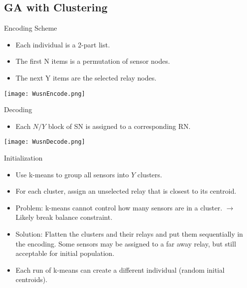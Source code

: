 \documentclass[main.tex]{subfiles}
\begin{document}
\subsection{GA with Clustering}
\begin{frame}{Encoding Scheme}
	\begin{itemize}
		\item Each individual is a 2-part list.
		\item The first N items is a permutation of sensor nodes.
		\item The next Y items are the selected relay nodes.
	\end{itemize}
	\begin{center}
		\texttt{[image: WusnEncode.png]}
	\end{center}
\end{frame}

\begin{frame}{Decoding}
	\begin{itemize}
		\item Each $N/Y$ block of SN is assigned to a corresponding RN.
	\end{itemize}
	\begin{center}
		\texttt{[image: WusnDecode.png]}
	\end{center}
\end{frame}

\begin{frame}{Initialization}
	\begin{itemize}
		\item Use k-means to group all sensors into $Y$ clusters.
		\item For each cluster, assign an unselected relay that is closest to its centroid.
		\pause
		\item Problem: k-means cannot control how many sensors are in a cluster. $\rightarrow$ Likely break balance constraint.
		\pause
		\item Solution: Flatten the clusters and their relays and put them sequentially in the encoding. Some sensors may be assigned to a far away relay, but still acceptable for initial population.
		\item Each run of k-means can create a different individual (random initial centroids).
	\end{itemize}
\end{frame}
\end{document}
